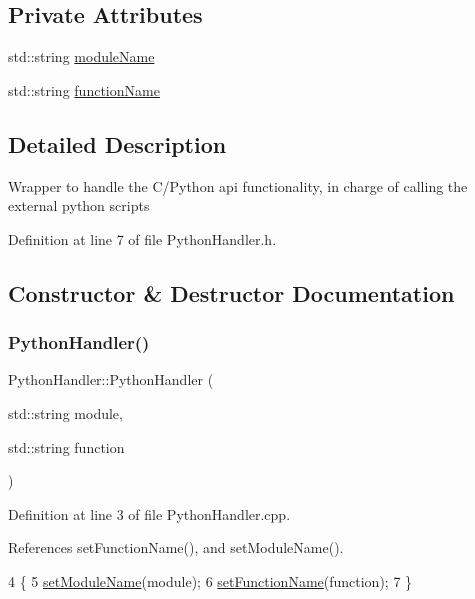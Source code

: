 \subsection*{Private Attributes}
\begin{DoxyCompactItemize}
\item 
std\+::string \hyperlink{class_python_handler_ae29ce86e7c2dce2340caa90ba1d6ac72}{module\+Name}
\item 
std\+::string \hyperlink{class_python_handler_a5946996068756c245e023cfe7e77f034}{function\+Name}
\end{DoxyCompactItemize}


\subsection{Detailed Description}
Wrapper to handle the C/\+Python api functionality, in charge of calling the external python scripts 

Definition at line 7 of file Python\+Handler.\+h.



\subsection{Constructor \& Destructor Documentation}
\mbox{\label{class_python_handler_ac49f0f52604ab7afb9443712bf1c2cd0}} 
\subsubsection{\texorpdfstring{Python\+Handler()}{PythonHandler()}}
{\footnotesize\ttfamily Python\+Handler\+::\+Python\+Handler (\begin{DoxyParamCaption}\item[{std\+::string}]{module,  }\item[{std\+::string}]{function }\end{DoxyParamCaption})}



Definition at line 3 of file Python\+Handler.\+cpp.



References set\+Function\+Name(), and set\+Module\+Name().


\begin{DoxyCode}
4 \{
5     \hyperlink{class_python_handler_a035cda1c3987043041c7aeb8e3440f04}{setModuleName}(module);
6     \hyperlink{class_python_handler_a640d790693c476a5bdd87050c7416ff0}{setFunctionName}(\textcolor{keyword}{function});
7 \}
\end{DoxyCode}


